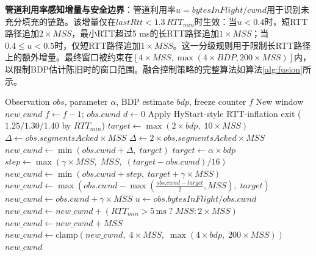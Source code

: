 \documentclass[10pt,twocolumn]{article}
\begin{document}
\textbf{管道利用率感知增量与安全边界}：管道利用率$u = bytesInFlight/cwnd$用于识别未充分填充的链路。该增量仅在$lastRtt < 1.3\,RTT_{min}$时生效：当$u<0.4$时，短RTT路径追加$2\times MSS$，最小RTT超过5 ms的长RTT路径追加$1\times MSS$；当$0.4 \leq u<0.5$时，仅短RTT路径追加$1\times MSS$。这一分级规则用于限制长RTT路径上的额外增量。最终窗口被约束在$[4\times MSS, \max(4\times BDP, 200\times MSS)]$内，以限制BDP估计陈旧时的窗口范围。融合控制策略的完整算法如算法\ref{alg:fusion}所示。

\begin{algorithm}[htbp]
\caption{Hybrid Rate-Window Fusion Control}
\label{alg:fusion}
\small
\begin{algorithmic}[1]
\REQUIRE Observation $obs$, parameter $\alpha$, BDP estimate $bdp$, freeze counter $f$
\ENSURE New window $new\_cwnd$
    \STATE $f \leftarrow f - 1$; \; \RETURN $obs.cwnd$ 
\ENDIF
\STATE $d \leftarrow 0$ 
    \STATE Apply HyStart-style RTT-inflation exit ($1.25/1.30/1.40$ by $RTT_{min}$)
    \STATE $target \leftarrow \max(2 \times bdp, \; 10 \times MSS)$
    \STATE $\Delta \leftarrow obs.segmentsAcked \times MSS$
        \STATE $\Delta \leftarrow 2 \times obs.segmentsAcked \times MSS$
    \ENDIF
    \STATE $new\_cwnd \leftarrow \min(obs.cwnd + \Delta, \; target)$
\ELSE
    \STATE $target \leftarrow \alpha \times bdp$
        \STATE $step \leftarrow \max(\gamma \times MSS, \; MSS, \; (target-obs.cwnd)/16)$
        \STATE $new\_cwnd \leftarrow \min(obs.cwnd + step, \; target + \gamma \times MSS)$
        \STATE $new\_cwnd \leftarrow \max(obs.cwnd - \max(\tfrac{obs.cwnd-target}{2}, MSS), \; target)$
    \ELSE
        \STATE $new\_cwnd \leftarrow obs.cwnd + \gamma \times MSS$
    \ENDIF
\ENDIF
{}
    \STATE $u \leftarrow obs.bytesInFlight / obs.cwnd$
        \STATE $new\_cwnd \leftarrow new\_cwnd + (RTT_{min} > 5\,\text{ms} \; ? \; MSS : 2 \times MSS)$
        \STATE $new\_cwnd \leftarrow new\_cwnd + MSS$
    \ENDIF
\ENDIF
\STATE $new\_cwnd \leftarrow \text{clamp}(new\_cwnd, \; 4 \times MSS, \; \max(4 \times bdp, \; 200 \times MSS))$
\RETURN $new\_cwnd$
\end{algorithmic}
\end{algorithm}
\end{document}
